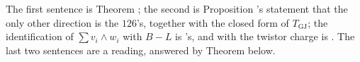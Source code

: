The first sentence is Theorem ; the second is Proposition 's statement that the only other direction is the $126$'s, together with the closed form of $T_{\mathrm{GJ}}$; the identification of $\sum v_{i}\wedge w_{i}$ with $B - L$ is \cite[Prop.~8.1]{ButlerT13}'s, and with the twistor charge is \cite[\S 3]{ButlerT9}. The last two sentences are a reading, answered by Theorem  below.
